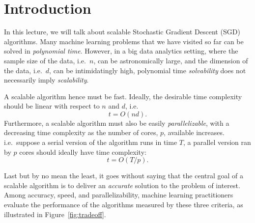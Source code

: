 \documentclass[12pt]{report}
\begin{document}

\maketitle

\vspace*{.1in}



\section{Introduction}
In this lecture, we will talk about scalable Stochastic Gradient Descent (SGD) algorithms. Many machine learning problems that we have visited so far can be solved in \emph{polynomial time}. However, in a big data analytics setting, where the sample size of the data, i.e.~$n$, can be astronomically large, and the dimension of the data, i.e.~$d$, can be intimidatingly high, polynomial time \emph{solvability} does not necessarily imply \emph{scalability}. 

A scalable algorithm hence must be fast. Ideally, the desirable time complexity should be linear with respect to $n$ and $d$, i.e.
\begin{equation*}
t = O(nd).
\end{equation*}
Furthermore, a scalable algorithm must also be easily \emph{parallelizable}, with a decreasing time complexity as the number of cores, $p$, available increases. i.e.~suppose a serial version of the algorithm runs in time $T$, a parallel version ran by $p$ cores should ideally have time complexity:
\begin{equation*}
t = O(T/p).
\end{equation*}

Last but by no mean the least, it goes without saying that the central goal of a scalable algorithm is to deliver an \emph{accurate} solution to the problem of interest. Among accuracy, speed, and parallelizability, machine learning practitioners evaluate the performance of the algorithms measured by these three criteria, as illustrated in Figure~\ref{fig:tradeoff}.
\end{document}
